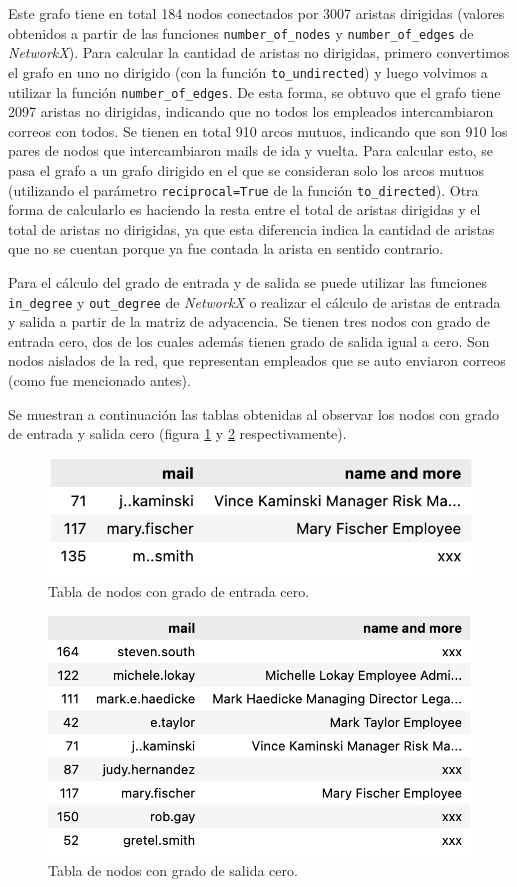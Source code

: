 \documentclass{article}
\begin{document}
Este grafo tiene en total 184 nodos conectados por 3007 aristas dirigidas (valores obtenidos a partir de las funciones \verb|number_of_nodes| y \verb|number_of_edges| de \textit{NetworkX}). Para calcular la cantidad de aristas no dirigidas, primero convertimos el grafo en uno no dirigido (con la función \verb|to_undirected|) y luego volvimos a utilizar la función \verb|number_of_edges|. De esta forma, se obtuvo que el grafo tiene 2097 aristas no dirigidas, indicando que no todos los empleados intercambiaron correos con todos. Se tienen en total 910 arcos mutuos, indicando que son 910 los pares de nodos que intercambiaron mails de ida y vuelta. Para calcular esto, se pasa el grafo a un grafo dirigido en el que se consideran solo los arcos mutuos (utilizando el parámetro \verb|reciprocal=True| de la función \verb|to_directed|). Otra forma de calcularlo es haciendo la resta entre el total de aristas dirigidas y el total de aristas no dirigidas, ya que esta diferencia indica la cantidad de aristas que no se cuentan porque ya fue contada la arista en sentido contrario.

Para el cálculo del grado de entrada y de salida se puede utilizar las funciones \verb|in_degree| y \verb|out_degree| de \textit{NetworkX} o realizar el cálculo de aristas de entrada y salida a partir de la matriz de adyacencia. Se tienen tres nodos con grado de entrada cero, dos de los cuales además tienen grado de salida igual a cero. Son nodos aislados de la red, que representan empleados que se auto enviaron correos (como fue mencionado antes).

Se muestran a continuación las tablas obtenidas al observar los nodos con grado de entrada y salida cero (figura \ref{fig:in_zero} y \ref{fig:out_zero} respectivamente).

\begin{figure}[htb]
    \centering
    \includegraphics[width=0.6\linewidth]{imagenes/ej1/in_degree_zero.png}
    \caption{Tabla de nodos con grado de entrada cero.}
    \label{fig:in_zero}
\end{figure}

\begin{figure}[htb]
    \centering
    \includegraphics[width=0.6\linewidth]{imagenes/ej1/out_degree_zero.png}
    \caption{Tabla de nodos con grado de salida cero.}
    \label{fig:out_zero}
\end{figure}
\end{document}
